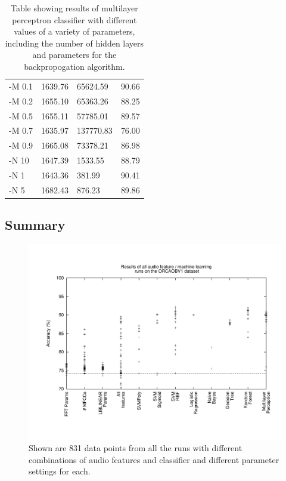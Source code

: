 \documentclass[12pt,oneside]{book}
\begin{document}
\begin{table}
\begin{tabular}{|l|l|l|l|}
 -M 0.1       &  1639.76  &     65624.59  &  90.66  \\
 -M 0.2       &  1655.10  &     65363.26  &  88.25  \\
 -M 0.5       &  1655.11  &     57785.01  &  89.57  \\
 -M 0.7       &  1635.97  &    137770.83  &  76.00  \\
 -M 0.9       &  1665.08  &     73378.21  &  86.98  \\
 -N 10        &  1647.39  &      1533.55  &  88.79  \\
 -N 1         &  1643.36  &       381.99  &  90.41  \\
 -N 5         &  1682.43  &       876.23  &  89.86  \\
\hline
\end{tabular}
\caption{Table showing results of
  multilayer perceptron classifier with different values of a variety
  of parameters, including the number of hidden layers and parameters
  for the backpropogation algorithm.}
\label{table:obv-weka-multilayerPerceptron}
\end{table}


\subsection{Summary}

\begin{figure}[t]
\centering
\includegraphics[width=\columnwidth]{figures/gnuplot-obv-all-data}
\caption{Shown are 831 data points from all the runs with different
  combinations of audio features and classifier and different
  parameter settings for each.}
\label{fig:gnuplot-obv-all-data}
\end{figure}
\end{document}
